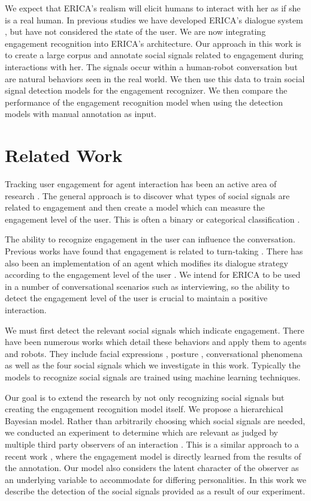\documentclass[letterpaper]{article} %
\begin{document}
We expect that ERICA's realism will elicit humans to interact with her as if she is a real human. In previous studies we have developed ERICA's dialogue system \cite{Lala2017,Milhorat2017}, but have not considered the state of the user. We are now integrating engagement recognition into ERICA's architecture. Our approach in this work is to create a large corpus and annotate social signals related to engagement during interactions with her. The signals occur within a human-robot conversation but are natural behaviors seen in the real world. We then use this data to train social signal detection models for the engagement recognizer. We then compare the performance of the engagement recognition model when using the detection models with manual annotation as input.


\section{Related Work}
Tracking user engagement for agent interaction has been an active area of research \cite{Rich2010,Forbes2012,Yu2016,Yu2017}. The general approach is to discover what types of social signals are related to engagement and then create a model which can measure the engagement level of the user. This is often a binary or categorical classification \cite{Bednarik2012}.

The ability to recognize engagement in the user can influence the conversation. Previous works have found that engagement is related to turn-taking \cite{Xu2013,Inoue2016}. There has also been an implementation of an agent which modifies its dialogue strategy according to the engagement level of the user \cite{Yu2016}. We intend for ERICA to be used in a number of conversational scenarios such as interviewing, so the ability to detect the engagement level of the user is crucial to maintain a positive interaction.

We must first detect the relevant social signals which indicate engagement. There have been numerous works which detail these behaviors and apply them to agents and robots. They include facial expressions \cite{Castellano2009,Yu2017}, posture \cite{Sanghvi2011}, conversational phenomena \cite{Rich2010,Xu2013} as well as the four social signals which we investigate in this work. Typically the models to recognize social signals are trained using machine learning techniques.

Our goal is to extend the research by not only recognizing social signals but creating the engagement recognition model itself. We propose a hierarchical Bayesian model. Rather than arbitrarily choosing which social signals are needed, we conducted an experiment to determine which are relevant as judged by multiple third party observers of an interaction \cite{Inoue2016}. This is a similar approach to a recent work \cite{Oertel2015}, where the engagement model is directly learned from the results of the annotation. Our model also considers the latent character of the observer as an underlying variable to accommodate for differing personalities. In this work we describe the detection of the social signals provided as a result of our experiment.
\end{document}
